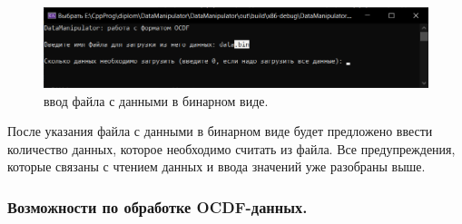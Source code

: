 {  \begin{figure}[H]
    \centering
    \includegraphics[width=\textwidth]{images/forDataManipulator/readOCDFbin.png}
    \caption{ввод файла с данными в бинарном виде.} 
    \label{fig:readOCDFbin}
  \end{figure}

  \par После указания файла с данными в бинарном виде будет предложено ввести количество данных, которое необходимо считать из файла. Все предупреждения, которые связаны с чтением данных и ввода значений уже разобраны выше. 

  \par
}

\subsubsection{ \standartTitleFont
  Возможности по обработке OCDF-данных. 
} \label{subsubsec:MenuOCDF}

